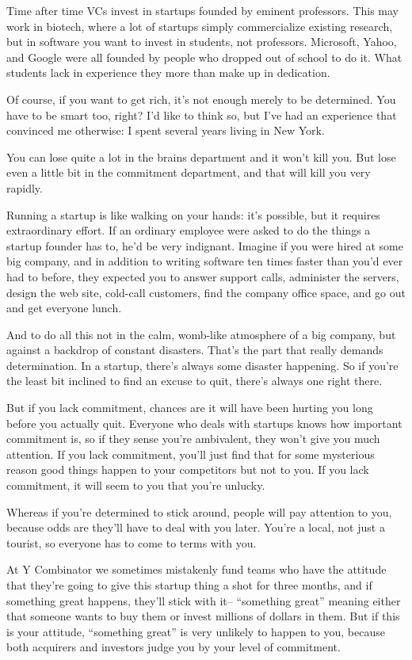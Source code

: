 \documentclass[12pt]{book}
\begin{document}
Time after time VCs invest in startups founded by eminent professors.
This may work in biotech, where a lot of startups simply commercialize
existing research, but in software you want to invest in students, not
professors. Microsoft, Yahoo, and Google were all founded by people who
dropped out of school to do it. What students lack in experience they
more than make up in dedication.

Of course, if you want to get rich, it's not enough merely to be
determined. You have to be smart too, right? I'd like to think so, but
I've had an experience that convinced me otherwise: I spent several
years living in New York.

You can lose quite a lot in the brains department and it won't kill you.
But lose even a little bit in the commitment department, and that will
kill you very rapidly.

Running a startup is like walking on your hands: it's possible, but it
requires extraordinary effort. If an ordinary employee were asked to do
the things a startup founder has to, he'd be very indignant. Imagine if
you were hired at some big company, and in addition to writing software
ten times faster than you'd ever had to before, they expected you to
answer support calls, administer the servers, design the web site,
cold-call customers, find the company office space, and go out and get
everyone lunch.

And to do all this not in the calm, womb-like atmosphere of a big
company, but against a backdrop of constant disasters. That's the part
that really demands determination. In a startup, there's always some
disaster happening. So if you're the least bit inclined to find an
excuse to quit, there's always one right there.

But if you lack commitment, chances are it will have been hurting you
long before you actually quit. Everyone who deals with startups knows
how important commitment is, so if they sense you're ambivalent, they
won't give you much attention. If you lack commitment, you'll just find
that for some mysterious reason good things happen to your competitors
but not to you. If you lack commitment, it will seem to you that you're
unlucky.

Whereas if you're determined to stick around, people will pay attention
to you, because odds are they'll have to deal with you later. You're a
local, not just a tourist, so everyone has to come to terms with you.

At Y Combinator we sometimes mistakenly fund teams who have the attitude
that they're going to give this startup thing a shot for three months,
and if something great happens, they'll stick with it-- ``something
great'' meaning either that someone wants to buy them or invest millions
of dollars in them. But if this is your attitude, ``something great'' is
very unlikely to happen to you, because both acquirers and investors
judge you by your level of commitment.
\end{document}
